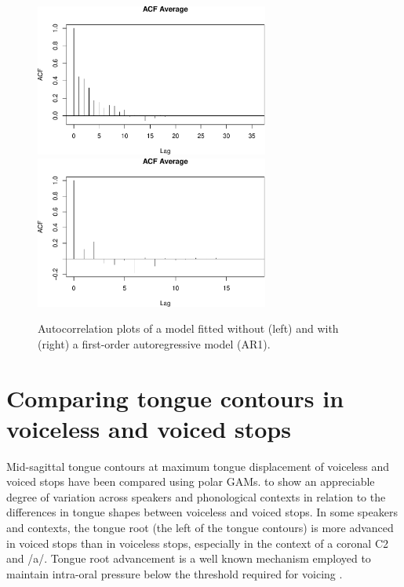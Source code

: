 \documentclass[12pt,]{article}
\begin{document}
\begin{figure}

{\centering \includegraphics[width=.7\linewidth,height=5cm]{2018-polar-gam_files/figure-latex/it01-acf-1} \includegraphics[width=.7\linewidth,height=5cm]{2018-polar-gam_files/figure-latex/it01-acf-2} 

}

\caption{Autocorrelation plots of a model fitted without (left) and with (right) a first-order autoregressive model (AR1).}\label{f:it01-acf}
\end{figure}

\hypertarget{comparing-tongue-contours-in-voiceless-and-voiced-stops}{%
\section{Comparing tongue contours in voiceless and voiced
stops}\label{comparing-tongue-contours-in-voiceless-and-voiced-stops}}

Mid-sagittal tongue contours at maximum tongue displacement of voiceless
and voiced stops have been compared using polar GAMs.
 to  show an appreciable
degree of variation across speakers and phonological contexts in
relation to the differences in tongue shapes between voiceless and
voiced stops. In some speakers and contexts, the tongue root (the left
of the tongue contours) is more advanced in voiced stops than in
voiceless stops, especially in the context of a coronal C2 and /a/.
Tongue root advancement is a well known mechanism employed to maintain
intra-oral pressure below the threshold required for voicing
\citep{ohala2011, kent1969, perkell1969, westbury1983, ahn2018}.
\end{document}
